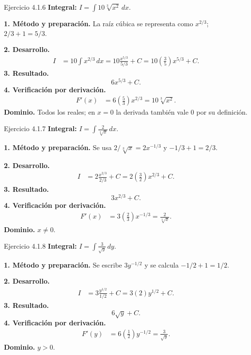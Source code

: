 \begin{examplebox}{Ejercicio 4.1.6}
\textbf{Integral:} $\displaystyle I=\int 10\sqrt[3]{x^2}\,dx$.

\textbf{1. Método y preparación.} La raíz cúbica se representa como $x^{2/3}$; $2/3+1=5/3$.

\textbf{2. Desarrollo.}
\begin{align*}
I&=10\int x^{2/3}\,dx=10\frac{x^{5/3}}{5/3}+C=10\left(\frac35\right)x^{5/3}+C.
\end{align*}
\textbf{3. Resultado.}
\[
6x^{5/3}+C.
\]
\textbf{4. Verificación por derivación.}
\begin{align*}
F'(x)&=6\left(\frac53\right)x^{2/3}=10\sqrt[3]{x^2}.
\end{align*}
\textbf{Dominio.} Todos los reales; en $x=0$ la derivada también vale $0$ por su definición.
\end{examplebox}

\begin{examplebox}{Ejercicio 4.1.7}
\textbf{Integral:} $\displaystyle I=\int \frac2{\sqrt[3]{x}}\,dx$.

\textbf{1. Método y preparación.} Se usa $2/\sqrt[3]{x}=2x^{-1/3}$ y $-1/3+1=2/3$.

\textbf{2. Desarrollo.}
\begin{align*}
I&=2\frac{x^{2/3}}{2/3}+C=2\left(\frac32\right)x^{2/3}+C.
\end{align*}
\textbf{3. Resultado.}
\[
3x^{2/3}+C.
\]
\textbf{4. Verificación por derivación.}
\begin{align*}
F'(x)&=3\left(\frac23\right)x^{-1/3}=\frac2{\sqrt[3]{x}}.
\end{align*}
\textbf{Dominio.} $x\ne0$.
\end{examplebox}

\begin{examplebox}{Ejercicio 4.1.8}
\textbf{Integral:} $\displaystyle I=\int \frac3{\sqrt y}\,dy$.

\textbf{1. Método y preparación.} Se escribe $3y^{-1/2}$ y se calcula $-1/2+1=1/2$.

\textbf{2. Desarrollo.}
\begin{align*}
I&=3\frac{y^{1/2}}{1/2}+C=3(2)y^{1/2}+C.
\end{align*}
\textbf{3. Resultado.}
\[
6\sqrt y+C.
\]
\textbf{4. Verificación por derivación.}
\begin{align*}
F'(y)&=6\left(\frac12\right)y^{-1/2}=\frac3{\sqrt y}.
\end{align*}
\textbf{Dominio.} $y>0$.
\end{examplebox}

